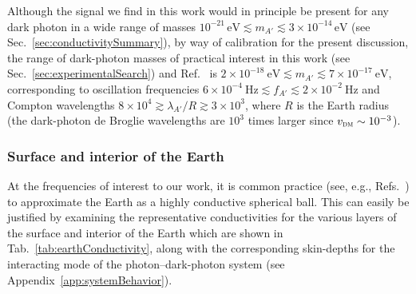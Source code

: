 \documentclass[amsmath,amssymb,aps,10pt,prd,letterpaper,nofootinbib,balancelastpage,notitlepage,superscriptaddress,twocolumn,floatfix]{revtex4-2}
\newcommand{\tabref}[2][]{Tab{#1}.~\ref{#2}}		%
\newcommand{\secref}[2][]{Sec{#1}.~\ref{#2}}		%
\newcommand{\appref}[2][x]{Appendi{#1}~\ref{#2}}	%
\newcommand{\citeR}[2][]{Ref{#1}.~\cite{#2}}		%
\begin{document}
Although the signal we find in this work would in principle be present for any dark photon in a wide range of masses $10^{-21}\,\text{eV} \lesssim m_{A'} \lesssim 3\times 10^{-14}\,\text{eV}$ (see \secref{sec:conductivitySummary}), by way of calibration for the present discussion, the range of dark-photon masses of practical interest in this work (see \secref{sec:experimentalSearch}) and \citeR{Fedderke:2021qva} is $2\times 10^{-18}~\textrm{eV} \lesssim m_{A'} \lesssim 7\times 10^{-17}~\textrm{eV}$, corresponding to oscillation frequencies $6\times 10^{-4}~\textrm{Hz} \lesssim f_{A'} \lesssim 2\times10^{-2}~\textrm{Hz}$ and Compton wavelengths $8\times10^4 \gtrsim \lambda_{A'}/R \gtrsim 3\times10^3$, where $R$ is the Earth radius (the dark-photon de Broglie wavelengths are $10^3$ times larger since $v_{\textsc{dm}}\sim10^{-3}$).


\subsubsection{Surface and interior of the Earth}
\label{sec:conductivityEarthInterior}
At the frequencies of interest to our work, it is common practice (see, e.g., \citeR[s]{Simoes:2012asf,Jackson}) to approximate the Earth as a highly conductive spherical ball. 
This can easily be justified by examining the representative conductivities for the various layers of the surface and interior of the Earth which are shown in \tabref{tab:earthConductivity}, along with the corresponding skin-depths for the interacting mode of the photon--dark-photon system (see \appref{app:systemBehavior}).
\end{document}
